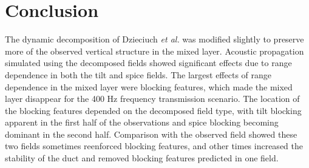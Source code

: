 \documentclass[preprint,NumberedRefs]{JASA}
\begin{document}
\section{Conclusion}\label{sec:conclusion}
The dynamic decomposition of Dzieciuch \emph{et al.} was modified slightly to preserve more of the observed vertical structure in the mixed layer. Acoustic propagation simulated using the decomposed fields showed significant effects due to range dependence in both the tilt and spice fields. The largest effects of range dependence in the mixed layer were blocking features, which made the mixed layer disappear for the 400 Hz frequency transmission scenario. The location of the blocking features depended on the decomposed field type, with tilt blocking apparent in the first half of the observations and spice blocking becoming dominant in the second half. Comparison with the observed field showed these two fields sometimes reenforced blocking features, and other times increased the stability of the duct and removed blocking features predicted in one field.




\end{document}
